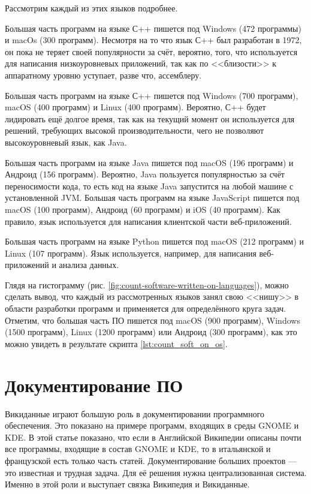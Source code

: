 Рассмотрим каждый из этих языков подробнее.

Большая часть программ на языке С++ пишется под Windows (472 программы) и macOs (300 программ). Несмотря на то что язык С++ был разработан в 1972, он пока не теряет своей популярности за счёт, вероятно, того, что используется для написания низкоуровневых приложений, так как по <<близости>> к аппаратному уровню уступает, разве что, ассемблеру.

Большая часть программ на языке С++ пишется под Windows (700 программ), macOS (400 программ) и Linux (400 программ). Вероятно, С++ будет лидировать ещё долгое время, так как на текущий момент он используется для решений, требующих высокой производительности, чего не позволяют высокоуровневый язык, как Java\cite{Cilyurik2014LangPerformance}.

Большая часть программ на языке Java пишется под macOS (196 программ) и Андроид (156 программ). Вероятно, Java пользуется популярностью за счёт переносимости кода\footnotemark, 
то есть код на языке Java запустится на любой машине с установленной JVM\footnotemark.
\marginnote[0.3cm]{}
Большая часть программ на языке JavaScript пишется под macOS (100 программ), Андроид (60 программ) и iOS (40 программ). Как правило, язык используется для написания клиентской части веб-приложений.

Большая часть программ на языке Python пишется под macOS (212 программ) и Linux (107 программ). Язык используется, например, для написания веб-приложений и анализа данных.

Глядя на гистограмму (рис. \ref{fig:count-software-written-on-languages}), можно сделать вывод, что каждый из рассмотренных языков занял свою <<нишу>> в области разработки программ и применяется для определённого круга задач. Отметим, что большая часть ПО пишется под macOS (900 программ), Windows (1500 программ), Linux (1200 программ) или Андроид (300 программ), как это можно увидеть в результате скрипта \ref{lst:count_soft_on_os}.

\section{Документирование ПО}
Викиданные играют большую роль в документировании программного обеспечения. Это показано на примере программ, входящих в среды GNOME и KDE\cite{Samuel2020DocumentingWiki}. В этой статье показано, что если в Английской Википедии описаны почти все программы, входящие в состав GNOME и KDE, то в итальянской и французской есть только часть статей. Документирование больших проектов --- это известная и трудная задача. Для её решения нужна централизованная система. Именно в этой роли и выступает связка Википедия и Викиданные\cite{Samuel2020DocumentingWiki}.


